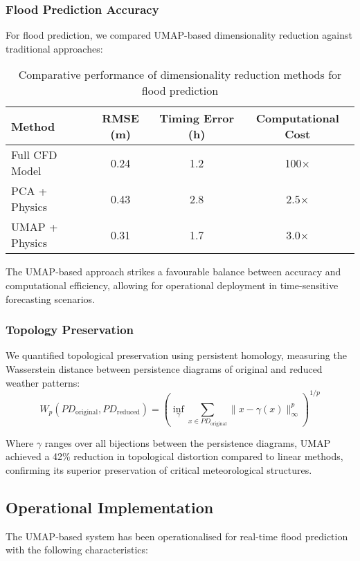 \documentclass{article}
\begin{document}
\subsubsection{Flood Prediction Accuracy}
For flood prediction, we compared UMAP-based dimensionality reduction against traditional approaches:

\begin{table}[h]
\centering
\begin{tabular}{|l|c|c|c|}
\hline
\textbf{Method} & \textbf{RMSE (m)} & \textbf{Timing Error (h)} & \textbf{Computational Cost} \\
\hline
Full CFD Model & 0.24 & 1.2 & 100× \\
\hline
PCA + Physics & 0.43 & 2.8 & 2.5× \\
\hline
UMAP + Physics & 0.31 & 1.7 & 3.0× \\
\hline
\end{tabular}
\caption{Comparative performance of dimensionality reduction methods for flood prediction}
\label{tab:flood_accuracy}
\end{table}

The UMAP-based approach strikes a favourable balance between accuracy and computational efficiency, allowing for operational deployment in time-sensitive forecasting scenarios.

\subsubsection{Topology Preservation}
We quantified topological preservation using persistent homology, measuring the Wasserstein distance between persistence diagrams of original and reduced weather patterns:
\begin{equation}
W_p(PD_{\text{original}}, PD_{\text{reduced}}) = \left(\inf_{\gamma} \sum_{x \in PD_{\text{original}}} \|x - \gamma(x)\|_{\infty}^p\right)^{1/p}
\end{equation}

Where $\gamma$ ranges over all bijections between the persistence diagrams, UMAP achieved a 42\% reduction in topological distortion compared to linear methods, confirming its superior preservation of critical meteorological structures.

\subsection{Operational Implementation}
The UMAP-based system has been operationalised for real-time flood prediction with the following characteristics:
\end{document}
